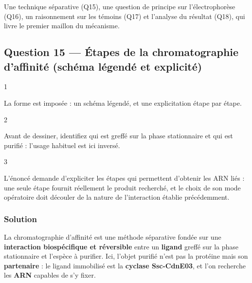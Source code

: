 \documentclass[11pt,a4paper]{article}
\begin{document}
Une technique séparative (Q15), une question de principe sur l'électrophorèse (Q16), un raisonnement sur les témoins (Q17) et l'analyse du résultat (Q18), qui livre le premier maillon du mécanisme.

\hypertarget{question-15-uxe9tapes-de-la-chromatographie-daffinituxe9-schuxe9ma-luxe9genduxe9-et-explicituxe9}{%
\subsection{Question 15 --- Étapes de la chromatographie d'affinité (schéma légendé et explicité)}\label{question-15-uxe9tapes-de-la-chromatographie-daffinituxe9-schuxe9ma-luxe9genduxe9-et-explicituxe9}}

\begin{indication}{1}

La forme est imposée : un schéma légendé, et une explicitation étape par étape.

\end{indication}

\begin{indication}{2}

Avant de dessiner, identifiez qui est greffé sur la phase stationnaire et qui est purifié : l'usage habituel est ici inversé.

\end{indication}

\begin{indication}{3}

L'énoncé demande d'expliciter les étapes qui permettent d'obtenir les ARN liés : une seule étape fournit réellement le produit recherché, et le choix de son mode opératoire doit découler de la nature de l'interaction établie précédemment.

\end{indication}

\hypertarget{solution-14}{%
\subsubsection{Solution}\label{solution-14}}

La chromatographie d'affinité est une méthode séparative fondée sur une \textbf{interaction biospécifique et réversible} entre un \textbf{ligand} greffé sur la phase stationnaire et l'espèce à purifier. Ici, l'objet purifié n'est pas la protéine mais son \textbf{partenaire} : le ligand immobilisé est la \textbf{cyclase Ssc-CdnE03}, et l'on recherche les \textbf{ARN} capables de s'y fixer.
\end{document}
